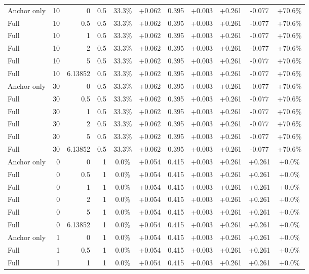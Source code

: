 \begin{table}[htbp]
\begin{tabular}{lrrrccccccc}
Anchor only & 10 & 0 & 0.5 & 33.3\% & +0.062 & 0.395 & +0.003 & +0.261 & -0.077 & +70.6\% \\
Full & 10 & 0.5 & 0.5 & 33.3\% & +0.062 & 0.395 & +0.003 & +0.261 & -0.077 & +70.6\% \\
Full & 10 & 1 & 0.5 & 33.3\% & +0.062 & 0.395 & +0.003 & +0.261 & -0.077 & +70.6\% \\
Full & 10 & 2 & 0.5 & 33.3\% & +0.062 & 0.395 & +0.003 & +0.261 & -0.077 & +70.6\% \\
Full & 10 & 5 & 0.5 & 33.3\% & +0.062 & 0.395 & +0.003 & +0.261 & -0.077 & +70.6\% \\
Full & 10 & 6.13852 & 0.5 & 33.3\% & +0.062 & 0.395 & +0.003 & +0.261 & -0.077 & +70.6\% \\
Anchor only & 30 & 0 & 0.5 & 33.3\% & +0.062 & 0.395 & +0.003 & +0.261 & -0.077 & +70.6\% \\
Full & 30 & 0.5 & 0.5 & 33.3\% & +0.062 & 0.395 & +0.003 & +0.261 & -0.077 & +70.6\% \\
Full & 30 & 1 & 0.5 & 33.3\% & +0.062 & 0.395 & +0.003 & +0.261 & -0.077 & +70.6\% \\
Full & 30 & 2 & 0.5 & 33.3\% & +0.062 & 0.395 & +0.003 & +0.261 & -0.077 & +70.6\% \\
Full & 30 & 5 & 0.5 & 33.3\% & +0.062 & 0.395 & +0.003 & +0.261 & -0.077 & +70.6\% \\
Full & 30 & 6.13852 & 0.5 & 33.3\% & +0.062 & 0.395 & +0.003 & +0.261 & -0.077 & +70.6\% \\
Anchor only & 0 & 0 & 1 & 0.0\% & +0.054 & 0.415 & +0.003 & +0.261 & +0.261 & +0.0\% \\
Full & 0 & 0.5 & 1 & 0.0\% & +0.054 & 0.415 & +0.003 & +0.261 & +0.261 & +0.0\% \\
Full & 0 & 1 & 1 & 0.0\% & +0.054 & 0.415 & +0.003 & +0.261 & +0.261 & +0.0\% \\
Full & 0 & 2 & 1 & 0.0\% & +0.054 & 0.415 & +0.003 & +0.261 & +0.261 & +0.0\% \\
Full & 0 & 5 & 1 & 0.0\% & +0.054 & 0.415 & +0.003 & +0.261 & +0.261 & +0.0\% \\
Full & 0 & 6.13852 & 1 & 0.0\% & +0.054 & 0.415 & +0.003 & +0.261 & +0.261 & +0.0\% \\
Anchor only & 1 & 0 & 1 & 0.0\% & +0.054 & 0.415 & +0.003 & +0.261 & +0.261 & +0.0\% \\
Full & 1 & 0.5 & 1 & 0.0\% & +0.054 & 0.415 & +0.003 & +0.261 & +0.261 & +0.0\% \\
Full & 1 & 1 & 1 & 0.0\% & +0.054 & 0.415 & +0.003 & +0.261 & +0.261 & +0.0\% \\

\end{tabular}
\end{table}
